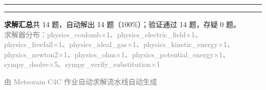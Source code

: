 \documentclass[12pt, a4paper]{article}
\begin{document}
\vspace{0.8em}\hrule\vspace{0.8em}

\vspace{1.5em}
\hrule\vspace{0.8em}
\begin{center}\small
\textbf{求解汇总}\quad 共 14 题，自动解出 14 题（100\%）；验证通过 14 题，存疑 0 题。\\[0.3em]
\textcolor{gray}{求解器分布：physics\_coulomb×1、physics\_electric\_field×1、physics\_freefall×1、physics\_ideal\_gas×1、physics\_kinetic\_energy×1、physics\_newton2×1、physics\_ohm×1、physics\_potential\_energy×1、sympy\_dsolve×5、sympy\_verify\_substitution×1}
\end{center}
\vfill\begin{center}\footnotesize\textcolor{gray}{由 Meteorain C4C 作业自动求解流水线自动生成}\end{center}
\end{document}
